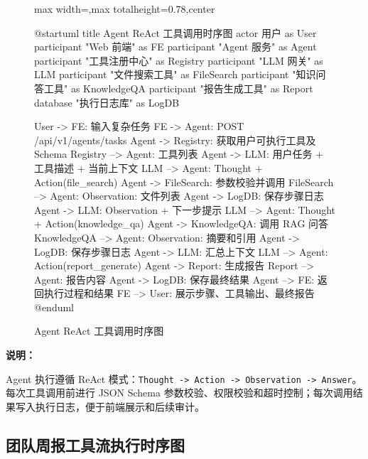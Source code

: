 \documentclass[a4paper,zihao=-4]{ctexart}
\providecommand{\passthrough}[1]{#1}
\begin{document}
\begin{figure}[H]
\centering
\begin{adjustbox}{max width=\linewidth,max totalheight=0.78\textheight,center}
\begingroup
\renewcommand{\PlantUMLJobname}{plantuml-diagrams/req-uml-05}
\begin{plantuml}
@startuml
title Agent ReAct 工具调用时序图
actor 用户 as User
participant "Web 前端" as FE
participant "Agent 服务" as Agent
participant "工具注册中心" as Registry
participant "LLM 网关" as LLM
participant "文件搜索工具" as FileSearch
participant "知识问答工具" as KnowledgeQA
participant "报告生成工具" as Report
database "执行日志库" as LogDB

User -> FE: 输入复杂任务
FE -> Agent: POST /api/v1/agents/tasks
Agent -> Registry: 获取用户可执行工具及 Schema
Registry --> Agent: 工具列表
Agent -> LLM: 用户任务 + 工具描述 + 当前上下文
LLM --> Agent: Thought + Action(file_search)
Agent -> FileSearch: 参数校验并调用
FileSearch --> Agent: Observation: 文件列表
Agent -> LogDB: 保存步骤日志
Agent -> LLM: Observation + 下一步提示
LLM --> Agent: Thought + Action(knowledge_qa)
Agent -> KnowledgeQA: 调用 RAG 问答
KnowledgeQA --> Agent: Observation: 摘要和引用
Agent -> LogDB: 保存步骤日志
Agent -> LLM: 汇总上下文
LLM --> Agent: Action(report_generate)
Agent -> Report: 生成报告
Report --> Agent: 报告内容
Agent -> LogDB: 保存最终结果
Agent --> FE: 返回执行过程和结果
FE --> User: 展示步骤、工具输出、最终报告
@enduml
\end{plantuml}
\endgroup
\end{adjustbox}
\caption{Agent ReAct 工具调用时序图}
\end{figure}

\textbf{说明：}

Agent 执行遵循 ReAct
模式：\passthrough{\lstinline!Thought -> Action -> Observation -> Answer!}。每次工具调用前进行
JSON Schema
参数校验、权限校验和超时控制；每次调用结果写入执行日志，便于前端展示和后续审计。

\hypertarget{ux56e2ux961fux5468ux62a5ux5de5ux5177ux6d41ux6267ux884cux65f6ux5e8fux56fe}{%
\subsection{团队周报工具流执行时序图}\label{ux56e2ux961fux5468ux62a5ux5de5ux5177ux6d41ux6267ux884cux65f6ux5e8fux56fe}}
\end{document}
